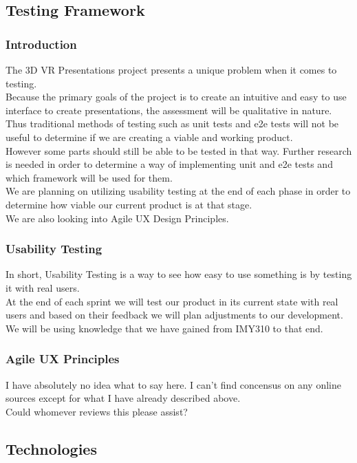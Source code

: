 \newpage

\subsection{Testing Framework}
	\subsubsection{Introduction}
		The 3D VR Presentations project presents a unique problem when it comes to testing.\\
		Because the primary goals of the project is to create an intuitive and easy to use interface to create presentations,
		the assessment will be qualitative in nature.\\
		Thus traditional methods of testing such as unit tests and e2e tests will not be useful to determine if we are creating a viable and working product.\\
		However some parts should still be able to be tested in that way. Further research is needed in order to determine a way of implementing unit and e2e tests and which framework will be used for them.\\
		We are planning on utilizing usability testing at the end of each phase in order to determine how viable our current product is at that stage.\\
		We are also looking into Agile UX Design Principles.

	\subsubsection{Usability Testing}
		In short, Usability Testing is a way to see how easy to use something is by testing it with real users.\\
		At the end of each sprint we will test our product in its current state with real users and based on their feedback we will plan adjustments to our development.
		We will be using knowledge that we have gained from IMY310 to that end.

	\subsubsection{Agile UX Principles}
		I have absolutely no idea what to say here. I can't find concensus on any online sources except for what I have already described above.\\
		Could whomever reviews this please assist?

\subsection{Technologies}
